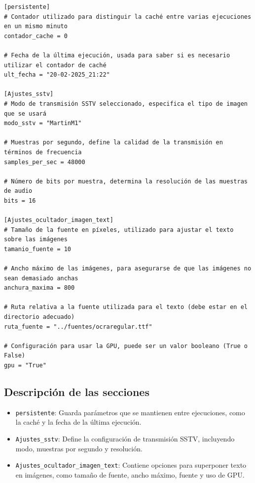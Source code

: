 \begin{verbatim}
[persistente]
# Contador utilizado para distinguir la caché entre varias ejecuciones en un mismo minuto
contador_cache = 0

# Fecha de la última ejecución, usada para saber si es necesario utilizar el contador de caché
ult_fecha = "20-02-2025_21:22"

[Ajustes_sstv]
# Modo de transmisión SSTV seleccionado, especifica el tipo de imagen que se usará
modo_sstv = "MartinM1"

# Muestras por segundo, define la calidad de la transmisión en términos de frecuencia
samples_per_sec = 48000

# Número de bits por muestra, determina la resolución de las muestras de audio
bits = 16

[Ajustes_ocultador_imagen_text]
# Tamaño de la fuente en píxeles, utilizado para ajustar el texto sobre las imágenes
tamanio_fuente = 10

# Ancho máximo de las imágenes, para asegurarse de que las imágenes no sean demasiado anchas
anchura_maxima = 800

# Ruta relativa a la fuente utilizada para el texto (debe estar en el directorio adecuado)
ruta_fuente = "../fuentes/ocraregular.ttf"

# Configuración para usar la GPU, puede ser un valor booleano (True o False)
gpu = "True"
\end{verbatim}

\subsection*{Descripción de las secciones}

\begin{itemize}
    \item \texttt{persistente}: Guarda parámetros que se mantienen entre ejecuciones, como la caché y la fecha de la última ejecución.
    \item \texttt{Ajustes\_sstv}: Define la configuración de transmisión SSTV, incluyendo modo, muestras por segundo y resolución.
    \item \texttt{Ajustes\_ocultador\_imagen\_text}: Contiene opciones para superponer texto en imágenes, como tamaño de fuente, ancho máximo, fuente y uso de GPU.
\end{itemize}


